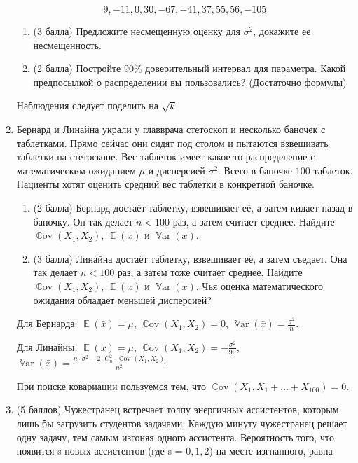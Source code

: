 \documentclass[12pt]{article}
\DeclareMathOperator{\E}{\mathbb{E}}
\DeclareMathOperator{\Var}{\mathbb{V}ar}
\DeclareMathOperator{\Cov}{\mathbb{C}ov}
\newenvironment{solution}{}{}
\begin{document}
\begin{enumerate}
        $$9, -11, 0, 30, -67, -41, 37, 55, 56, -105$$
        
    \begin{enumerate}
    \item (3 балла) Предложите несмещенную оценку для $\sigma^2$, докажите ее несмещенность. 
    \item (2 балла) Постройте $90\%$ доверительный интервал для параметра. Какой предпосылкой о распределении вы пользовались? (Достаточно формулы)
    \end{enumerate}

\begin{solution}
Наблюдения следует поделить на $\sqrt{k}$
\end{solution}
    
    
    
    \item Бернард и Линайна украли у главврача стетоскоп и несколько баночек с таблетками. Прямо сейчас они сидят под столом и пытаются взвешивать таблетки на стетоскопе. Вес таблеток имеет какое-то распределение с математическим ожиданием $\mu$ и дисперсией $\sigma^2$. Всего в баночке $100$ таблеток. Пациенты хотят оценить средний вес таблетки в конкретной баночке.

    \begin{enumerate}
    \item (2 балла) Бернард достаёт таблетку, взвешивает её, а затем кидает назад в баночку. Он так делает $n < 100$ раз, а затем считает среднее. Найдите $\Cov(X_1, X_2)$, $\E(\bar x)$ и $\Var(\bar x)$.
    \item (3 балла) Линайна достаёт таблетку, взвешивает её, а затем съедает. Она так делает $n < 100$ раз, а затем тоже считает среднее. Найдите $\Cov(X_1, X_2)$, $\E(\bar x)$ и $\Var(\bar x)$. Чья оценка математического ожидания обладает меньшей дисперсией? 
    \end{enumerate}

\begin{solution} 
Для Бернарда: $\E(\bar x) = \mu$, $\Cov(X_1, X_2) = 0$, $\Var(\bar x) = \frac{\sigma^2}{n}$.

Для Линайны: $\E(\bar x) = \mu$, $\Cov(X_1, X_2) = - \frac{\sigma^2}{99}$, $\Var(\bar x) = \frac{n \cdot \sigma^2 - 2 \cdot C_n^2 \cdot \Cov(X_1, X_2)}{n^2}$.

При поиске ковариации пользуемся тем, что $\Cov(X_1, X_1 + \ldots + X_{100}) = 0$.
\end{solution} 

    \item (5 баллов) Чужестранец встречает толпу энергичных ассистентов, которым лишь бы загрузить студентов задачами. Каждую минуту чужестранец решает одну задачу, тем самым изгоняя одного ассистента. Вероятность того, что появится s новых ассистентов (где s = $0, 1, 2$) на месте изгнанного, равна 
    

\end{enumerate}
\end{document}
